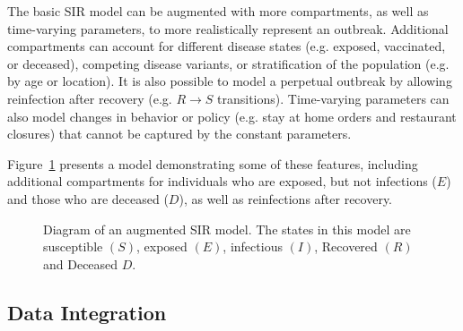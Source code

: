The basic SIR model can be augmented with more compartments, as well as time-varying parameters, to more realistically represent an outbreak.
Additional compartments can account for different disease states (e.g. exposed, vaccinated, or deceased), competing disease variants, or stratification of the population (e.g. by age or location).
It is also possible to model a perpetual outbreak by allowing reinfection after recovery (e.g. \(R \to S\) transitions).
Time-varying parameters can also model changes in behavior or policy (e.g. stay at home orders and restaurant closures) that cannot be captured by the constant parameters.

Figure~\ref{ch_2:fig:SEIRDS_diagram} presents a model demonstrating some of these features, including additional compartments for individuals who are exposed, but not infections (\( E \)) and those who are deceased (\( D \)), as well as reinfections after recovery.

\begin{figure}
    \centering
    \caption{Diagram of an augmented SIR model.
    The states in this model are susceptible \( (S) \), exposed \( (E) \), infectious \( (I) \), Recovered \( (R) \) and Deceased \( D \).}
    \label{ch_2:fig:SEIRDS_diagram}
\end{figure}

\subsection{Data Integration}

